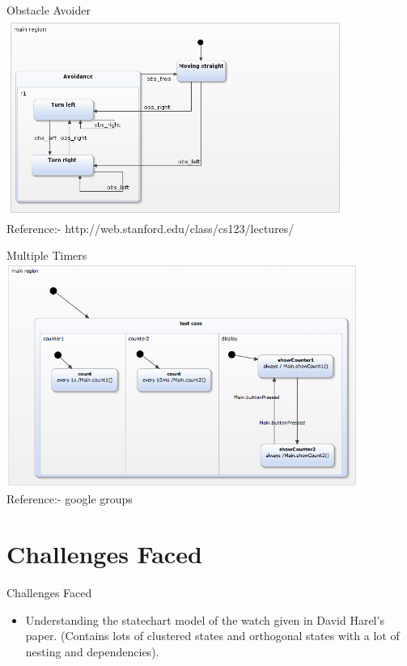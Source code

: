 \documentclass[10pt, a4paper]{beamer}
\begin{document}
\begin{frame}{Obstacle Avoider}
\includegraphics[width=11.04cm, height=6.5cm]{obstacle_avoider.png}
\\
Reference:- http://web.stanford.edu/class/cs123/lectures/
\end{frame}

\begin{frame}{Multiple Timers}
\includegraphics[width=11.48cm, height=7.3cm]{ortho.png}
\\
Reference:- google groups
\end{frame}

\section{Challenges Faced}
\begin{frame}{Challenges Faced}
	\begin{itemize}
		\item Understanding the statechart model of the watch given in David Harel's paper. (Contains lots of clustered states and orthogonal states with a lot of nesting and dependencies). 
	\end{itemize}
\end{frame}
\end{document}
